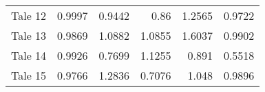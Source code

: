 \begin{table}[h]
\begin{tabular}{lrrrrr}
 Tale 12 &                        0.9997 &                      0.9442 &                        0.86   &                          1.2565 &                         0.9722 \\
 Tale 13 &                        0.9869 &                      1.0882 &                        1.0855 &                          1.6037 &                         0.9902 \\
 Tale 14 &                        0.9926 &                      0.7699 &                        1.1255 &                          0.891  &                         0.5518 \\
 Tale 15 &                        0.9766 &                      1.2836 &                        0.7076 &                          1.048  &                         0.9896 \\
\bottomrule
\end{tabular}
\end{table}